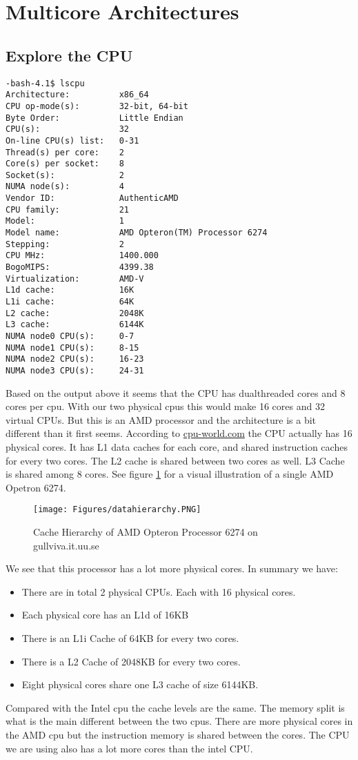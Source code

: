 \section{Multicore Architectures}

\subsection{Explore the CPU}

\begin{lstlisting}[caption=Output from lscpu command]
-bash-4.1$ lscpu
Architecture:          x86_64
CPU op-mode(s):        32-bit, 64-bit
Byte Order:            Little Endian
CPU(s):                32
On-line CPU(s) list:   0-31
Thread(s) per core:    2
Core(s) per socket:    8
Socket(s):             2
NUMA node(s):          4
Vendor ID:             AuthenticAMD
CPU family:            21
Model:                 1
Model name:            AMD Opteron(TM) Processor 6274
Stepping:              2
CPU MHz:               1400.000
BogoMIPS:              4399.38
Virtualization:        AMD-V
L1d cache:             16K
L1i cache:             64K
L2 cache:              2048K
L3 cache:              6144K
NUMA node0 CPU(s):     0-7
NUMA node1 CPU(s):     8-15
NUMA node2 CPU(s):     16-23
NUMA node3 CPU(s):     24-31
\end{lstlisting}

Based on the output above it seems that the CPU has dualthreaded cores and 8 
cores per cpu. With our two physical cpus this would make 16 cores and 32 virtual
CPUs. But this is an AMD processor and the architecture is a bit different than
it first seems. According to \href{https://www.cpu-world.com/CPUs/Bulldozer/AMD-Opteron%206274%20OS6274WKTGGGU.html}{cpu-world.com}
the CPU actually has 16 physical cores. It has L1 data caches for each core, and 
shared instruction caches for every two cores. The L2 cache is shared between 
two cores as well. L3 Cache is shared among 8 cores. See figure \ref{fig:amd}
for a visual illustration of a single AMD Opetron 6274.

\begin{figure}[!h]
    \centering
    \texttt{[image: Figures/datahierarchy.PNG]}
    \caption{Cache Hierarchy of AMD Opteron Processor 6274 on gullviva.it.uu.se}
    \label{fig:amd}
\end{figure}

We see that this processor has a lot more physical cores. In summary we have:

\begin{itemize}
    \item There are in total 2 physical CPUs. Each with 16 physical cores.
    \item Each physical core has an L1d of 16KB
    \item There is an L1i Cache of 64KB for every two cores. 
    \item There is a L2 Cache of 2048KB for every two cores.
    \item Eight physical cores share one L3 cache of size 6144KB.
\end{itemize}

Compared with the Intel cpu the cache levels are the same. The memory split
is what is the main different between the two cpus. There are more physical
cores in the AMD cpu but the instruction memory is shared between the cores. 
The CPU we are using also has a lot more cores than the intel CPU.